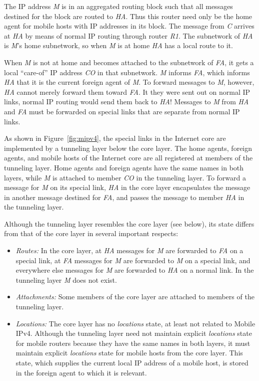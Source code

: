 The IP address {\it M} is in an aggregated routing block such that
all messages destined for the block are routed to {\it HA}.
Thus this router need only be the home agent for mobile hosts with
IP addresses in its
block.
The message from {\it C} arrives at {\it HA} by means of normal IP
routing through router {\it R1}.
The subnetwork of {\it HA} is {\it M}'s home subnetwork, so when {\it M}
is at home {\it HA} has a local route to it.

When {\it M} is not at home and becomes
attached to the subnetwork of {\it FA}, it gets a local ``care-of''
IP address {\it CO}
in that subnetwork.
{\it M} informs {\it FA},
which informs {\it HA} that it is the current foreign agent of {\it M}.
To forward messages to {\it M}, however, {\it HA} cannot merely forward
them toward {\it FA}.
It they were sent out on normal IP links, normal IP routing would send
them back to {\it HA}!
Messages to {\it M} from {\it HA} and {\it FA} must be forwarded on
special links that are separate from normal IP links.

As shown in Figure~\ref{fig:mipv4}, the special links in the Internet
core are implemented by a tunneling layer below the core layer.
The home agents, foreign agents, and mobile hosts of the Internet core
are all registered at members of the tunneling layer.
Home agents and foreign agents have the same names in both layers,
while
{\it M} is attached to member {\it CO} in the tunneling layer.
To forward a message for {\it M}
on its special link, {\it HA} in the core layer encapsulates the
message in another message destined for {\it FA}, and passes the message
to member {\it HA} in the tunneling layer.

Although the tunneling layer resembles the core layer (see below), 
its state differs from that of the core layer in several important 
respects:
\begin{itemize}
\item
{\it Routes:}
In the core layer, 
at {\it HA} messages for {\it M} are forwarded to {\it FA} on a special 
link,
at {\it FA} messages for {\it M} are forwarded to {\it M} on a special 
link,
and everywhere else messages for {\it M} are forwarded to {\it HA} on 
a normal link.
In the tunneling layer {\it M} does not exist.
\item
{\it Attachments:}
Some
members of the core layer are attached to members of the tunneling layer.
\item
{\it Locations:}
The core layer has no {\it locations} state, at least not related to
Mobile IPv4.
Although the tunneling layer need not maintain explicit
{\it locations} state for
mobile routers because they have the same names in both layers,
it must maintain explicit {\it locations} state for mobile hosts from the
core layer.
This state, which supplies the current local IP address of a mobile host,
is stored in the foreign agent to which it is relevant.
\end{itemize}

